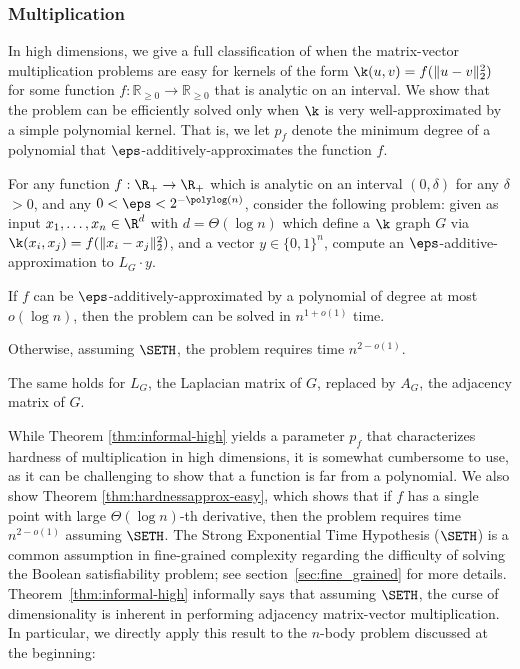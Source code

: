 \subsubsection{Multiplication} 

In high dimensions, we give a full classification of when the
matrix-vector multiplication problems are easy for kernels of the form
$\k(u,v) = f(\|u - v\|_2^2)$ for some function $f:\mathbb{R}_{\ge
  0}\rightarrow \mathbb{R}_{\ge 0}$ that is analytic on an interval. We
  show that the problem can be efficiently solved only when $\k$ is very
  well-approximated by a simple polynomial kernel. That is, we let $p_f$
  denote the minimum degree of a polynomial that
  $\eps$-additively-approximates the function $f$.

\begin{theorem} \label{thm:informal-high}
For any function $f : \R_+ \to \R_+$ which is analytic on an interval
$(0,\delta)$ for any $\delta$ $>0$, and any $0 < \eps <
2^{-\polylog(n)}$, consider the following problem: given as input $x_1,
  \ldots, x_n \in \R^d$ with $d = \Theta(\log n)$ which define a $\k$
  graph $G$ via $\k(x_i, x_j) = f(\|x_i -x_j\|_2^2)$, and a vector $y
  \in \{0,1\}^n$, compute an $\eps$-additive-approximation to $L_G \cdot
  y$.  \begin{tight_itemize} \item If $f$ can be
  $\eps$-additively-approximated by a polynomial of degree at most
  $o(\log n)$, then the problem can be solved in $n^{1+o(1)}$ time.
  \item Otherwise, assuming $\SETH$, the problem requires time $n^{2 -
    o(1)}$.  \end{tight_itemize} The same holds for $L_G$, the Laplacian
    matrix of $G$, replaced by $A_G$, the adjacency matrix of $G$.
    \end{theorem}

While Theorem \ref{thm:informal-high} yields a parameter $p_f$ that
characterizes hardness of multiplication in high dimensions, it is
somewhat cumbersome to use, as it can be challenging to show that a
function is far from a polynomial. We also show Theorem
\ref{thm:hardnessapprox-easy}, which shows that if $f$ has a single
point with large $\Theta(\log n)$-th derivative, then the problem
requires time $n^{2-o(1)}$ assuming $\SETH$. The Strong Exponential Time
Hypothesis ($\SETH$) is a common assumption in fine-grained complexity
regarding the difficulty of solving the Boolean satisfiability problem;
see 
section~\ref{sec:fine_grained} for more details.
Theorem~\ref{thm:informal-high} informally says that assuming $\SETH$,
  the curse of dimensionality is inherent in performing adjacency
  matrix-vector multiplication. In particular, we directly apply this
  result to the $n$-body problem discussed at the beginning:

